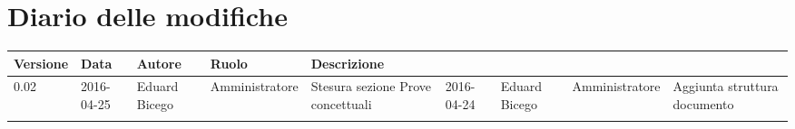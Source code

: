 
	\section*{Diario delle modifiche}
\begin{longtabu} to \textwidth {V X[c m 0.8cm] X[c m 0.7cm] X[c m 0.8cm] X[cm]}
	\toprule
	\textbf{Versione} & \textbf{Data}  & \textbf{Autore} & \textbf{Ruolo} & \textbf{Descrizione}\\
	\midrule
	\endhead

0.02 & 2016-04-25 & Eduard Bicego & Amministratore & Stesura sezione Prove concettuali
 & 2016-04-24 & Eduard Bicego & Amministratore & Aggiunta struttura documento \\ 

	\bottomrule
\end{longtabu}
